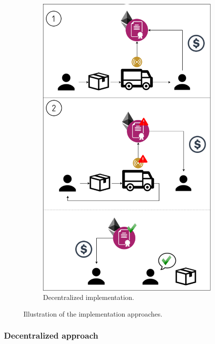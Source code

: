 \begin{figure}[H]
\begin{subfigure}{.435\textwidth}
\centering
\includegraphics[width=.8\linewidth]{images/proposedservice.png}
\caption{Decentralized implementation.}
\label{fig:prop}
\end{subfigure}
\caption{Illustration of the implementation approaches.}
\label{fig:test}
\end{figure}

\subsubsection{Decentralized approach} \label{section:decentralizedapproach}

